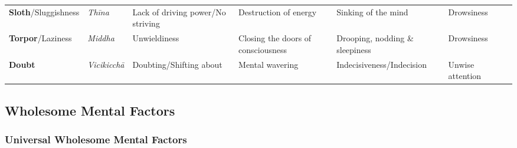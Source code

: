 \documentclass[a4 paper, 12pt]{article}
\begin{document}
\begin{tabular}{P{0.21\textwidth} | C{.13\textwidth} C{.165\textwidth} C{0.165\textwidth} C{0.165\textwidth} C{0.165\textwidth} m{0mm}}
\textbf{Sloth}/\newline Sluggishness & \textit{Thīna} & Lack of driving power/No striving & Destruction of energy & Sinking of the mind & Drowsiness &\\[9mm]
\textbf{Torpor}/\newline Laziness & \textit{Middha} & Unwieldiness & Closing the doors of consciousness & Drooping, nodding \& sleepiness & Drowsiness &\\[9mm]
\textbf{Doubt} & \textit{Vicikicchā} & Doubting/\newline Shifting about & Mental wavering & Indecisiveness/\newline Indecision & Unwise attention &\\[9mm]
\bottomrule
\end{tabular}

\subsection*{Wholesome Mental Factors}

\subsubsection*{Universal Wholesome Mental Factors}
\end{document}
